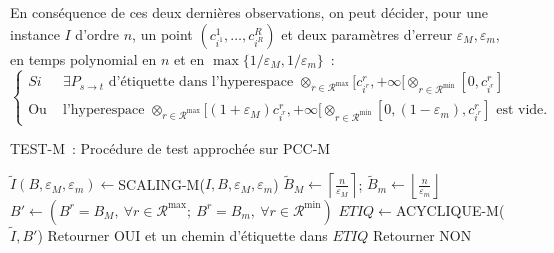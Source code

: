 \documentclass[10pt,francais]{llncs}
\begin{document}
{En cons\'equence de ces deux derni\`eres observations, on peut d\'ecider, pour une instance $I$ d'ordre $n$, un point $(c^1_{i^1},\ldots,c^R_{i^R})$ et deux param\`etres d'erreur $\varepsilon_M,\varepsilon_m$, en temps polynomial en $n$ et en $\max\{1/\varepsilon_M,1/\varepsilon_m\}$~:
$$\left\{\begin{array}{ll}
Si			&\exists P_{s \to t}\textrm{ d'\'etiquette dans l'hyperespace }\otimes_{r\in \mathscr{R}^{\max}}[c^r_{i^r},+\infty[\otimes_{r\in \mathscr{R}^{\min}}[0,c^r_{i^r}]\\
\textrm{Ou si}	&\textrm{l'hyperespace }\otimes_{r\in \mathscr{R}^{\max}}[(1+\varepsilon_M)c^r_{i^r},+\infty[\otimes_{r\in \mathscr{R}^{\min}}[0,(1-\varepsilon_m),c^r_{i^r}]\textrm{ est vide.}\end{array}\right.$$

\begin{algorithm}\label{algo-test-m}
\caption{TEST-M~: Proc\'edure de test approch\'ee sur \textsc{PCC-M}}
\Entree{$I$ instance, $B=(B^1,\ldots,B^R)$ vecteur, $\varepsilon_M,\varepsilon_m\in]0,1[$ erreurs}
\BlankLine
{}
\BlankLine
$\tilde{I}(B,\varepsilon_M,\varepsilon_m)\leftarrow$SCALING-M($I,B,\varepsilon_M,\varepsilon_m$)\;
\BlankLine
$\displaystyle \tilde{B}_M\leftarrow\left\lceil \frac{n}{\varepsilon_M}\right\rceil$; 
$\displaystyle \tilde{B}_m\leftarrow\left\lfloor \frac{n}{\varepsilon_m}\right\rfloor$\;
\BlankLine
$B'\leftarrow(B^r = B_M,\ \forall r\in \mathscr{R}^{\max};\ B^r = B_m,\ \forall r\in \mathscr{R}^{\min})$\;
$ETIQ\leftarrow$ACYCLIQUE-M($\tilde{I},B'$)\;
	{Retourner OUI et un chemin d'\'etiquette dans $ETIQ$}
\Sinon
	{Retourner NON} 
\end{algorithm}


}
\end{document}
